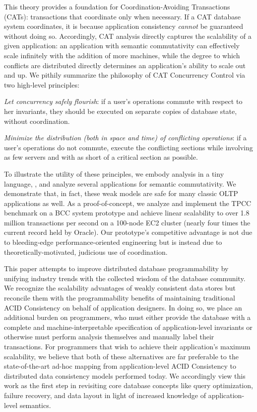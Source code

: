 This theory provides a foundation for Coordination-Avoiding
Transactions (CATs): transactions that coordinate only when necessary.
If a CAT database system coordinates, it is because application
consistency \textit{cannot} be guaranteed without doing
so. Accordingly, CAT analysis directly captures the scalability of a
given application: an application with semantic commutativity can
effectively scale infinitely with the addition of more machines, while
the degree to which conflicts are distributed directly determines an
application's ability to scale out and up. We pithily summarize the
philosophy of CAT Concurrency Control via two high-level principles:
\begin{introenumerate}
\item \textit{Let concurrency safely flourish}: if a user's operations
  commute with respect to her invariants, they should be executed on
  separate copies of database state, without coordination.
\item \textit{Minimize the distribution (both in space and time) of
  conflicting operations}: if a user's operations do not commute,
  execute the conflicting sections while involving as few servers and
  with as short of a critical section as possible.
\end{introenumerate}
To illustrate the utility of these principles, we embody \iconfluence
analysis in a tiny language, \lang, and analyze several applications
for semantic commutativity. We demonstrate that, in fact, these weak
models are safe for many classic OLTP applications as well. As a
proof-of-concept, we analyze and implement the TPCC benchmark on a BCC
system prototype and achieve linear scalability to over 1.8 million
transactions per second on a 100-node EC2 cluster (nearly four times
the current record held by Oracle). Our prototype's competitive
advantage is not due to bleeding-edge performance-oriented engineering
but is instead due to theoretically-motivated, judicious use of
coordination.

This paper attempts to improve distributed database programmability by
unifying industry trends with the collected wisdom of the database
community. We recognize the scalability advantages of weakly
consistent data stores but reconcile them with the programmability
benefits of maintaining traditional ACID Consistency on behalf of
application designers. In doing so, we place an additional burden on
programmers, who must either provide the database with a complete and
machine-interpretable specification of application-level invariants or
otherwise must perform analysis themselves and manually label their
transactions. For programmers that wish to achieve their application's
maximum scalability, we believe that both of these alternatives are
far preferable to the state-of-the-art ad-hoc mapping from
application-level ACID Consistency to distributed data consistency
models performed today. We accordingly view this work as the first
step in revisiting core database concepts like query optimization,
failure recovery, and data layout in light of increased knowledge of
application-level semantics.

